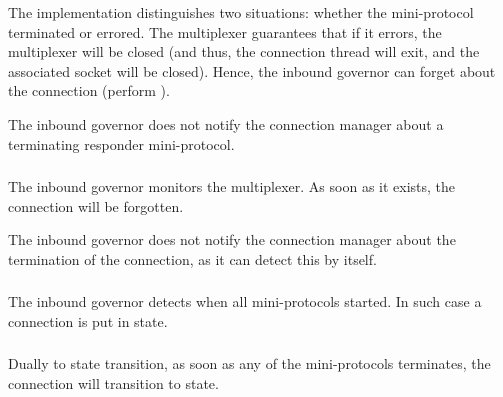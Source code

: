 \begin{detail}
  The implementation distinguishes two situations: whether the mini-protocol
  terminated or errored.  The multiplexer guarantees that if it errors, the
  multiplexer will be closed (and thus, the connection thread will exit, and the
  associated socket will be closed).   Hence, the inbound governor can forget about the
  connection
  (perform \MuxTerminated{}).

  The inbound governor does not notify the connection manager about a terminating
  responder mini-protocol.
\end{detail}

\subsubsection{\MuxTerminated}
The inbound governor monitors the multiplexer.  As soon as it exists, the
connection will be forgotten.

The inbound governor does not notify the connection manager about the
termination of the connection, as it can detect this by itself.

\subsubsection{\PromotedToHotRemote}
The inbound governor detects when all \hot{} mini-protocols started.   In such
case a \RemoteWarm{} connection is put in \RemoteHot{} state.

\subsubsection{\DemotedToWarmRemote}
Dually to \PromotedToHotRemote{} state transition, as soon as any of the \hot{}
mini-protocols terminates, the connection will transition to \RemoteWarm{}
state.


